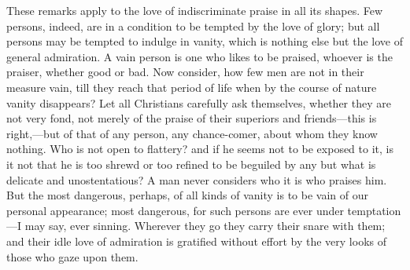 These remarks apply to the love of indiscriminate praise in all its
shapes. Few persons, indeed, are in a condition to be tempted by the
love of glory; but all persons may be tempted to indulge in vanity,
which is nothing else but the love of general admiration. A vain
person is one who likes to be praised, whoever is the praiser, whether
good or bad. Now consider, how few men are not in their measure vain,
till they reach that period of life when by the course of nature
vanity disappears? Let all Christians carefully ask themselves,
whether they are not very fond, not merely of the praise of their
superiors and friends—this is right,—but of that of any person,
any chance-comer, about whom they know nothing. Who is not open to
flattery? and if he seems not to be exposed to it, is it not that he
is too shrewd or too refined to be beguiled by any but what is
delicate and unostentatious? A man never considers who it is who
praises him. But the most dangerous, perhaps, of all kinds of vanity
is to be vain of our personal appearance; most dangerous, for such
persons are ever under temptation—I may say, ever sinning. Wherever
they go they carry their snare with them; and their idle love of
admiration is gratified without effort by the very looks of those who
gaze upon them.

